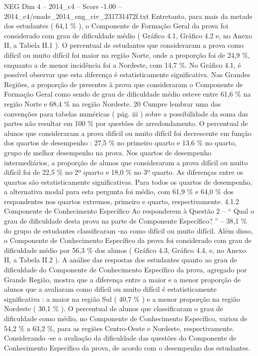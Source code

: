 \begin{textsample}{NEG Dim 4 – 2014\_c4 – Score -1.00 – 2014\_c4/enade\_2014\_eng\_civ\_231731472f.txt}
Entretanto, para mais da metade dos estudantes ( 64,1 \% ), o Componente de Formação Geral da prova foi considerado com grau de dificuldade médio ( Gráfico 4.1, Gráfico 4.2 e, no Anexo II, a Tabela II.1 ).
O percentual de estudantes que consideraram a prova como difícil ou muito difícil foi maior na região Norte, onde a proporção foi de 24,9 \%, enquanto a de menor incidência foi a Nordeste, com 14,7 \%.
No Gráfico 4.1, é possível observar que esta diferença é estatisticamente significativa.
Nas Grandes Regiões, a proporção de presentes à prova que consideraram o Componente de Formação Geral como sendo de grau de dificuldade médio esteve entre 61,6 \% na região Norte e 68,4 \% na região Nordeste. 20 Cumpre lembrar uma das convenções para tabelas numéricas ( pág. iii ) sobre a possibilidade da soma das partes não resultar em 100 \% por questões de arredondamento.
O percentual de alunos que consideraram a prova difícil ou muito difícil foi decrescente em função dos quartos de desempenho : 27,5 \% no primeiro quarto e 13,6 \% no quarto, grupo de melhor desempenho na prova.
Nos quartos de desempenho intermediários, a proporção de alunos que consideraram a prova difícil ou muito difícil foi de 22,5 \% no 2º quarto e 18,0 \% no 3º quarto.
As diferenças entre os quartos são estatisticamente significativas.
Para todos os quartos de desempenho, a alternativa modal para esta pergunta foi médio, com 61,9 \% e 64,0 \% dos respondentes nos quartos extremos, primeiro e quarto, respectivamente. 4.1.2 Componente de Conhecimento Específico Ao responderem à Questão 2 – “ Qual o grau de dificuldade desta prova na parte de Componente Específico? ” – 38,1 \% do grupo de estudantes classificaram -na como difícil ou muito difícil.
Além disso, o Componente de Conhecimento Específico da prova foi considerado com grau de dificuldade médio por 56,3 \% dos alunos ( Gráfico 4.3, Gráfico 4.4, e, no Anexo II, a Tabela II.2 ).
A análise das respostas dos estudantes quanto ao grau de dificuldade do Componente de Conhecimento Específico da prova, agregado por Grande Região, mostra que a diferença entre a maior e a menor proporção de alunos que a avaliaram como difícil ou muito difícil é estatisticamente significativa : a maior na região Sul ( 40,7 \% ) e a menor proporção na região Nordeste ( 30,1 \% ).
O percentual de alunos que classificaram o grau de dificuldade como médio, no Componente de Conhecimento Específico, variou de 54,2 \% a 63,2 \%, para as regiões Centro-Oeste e Nordeste, respectivamente.
Considerando -se a avaliação da dificuldade das questões do Componente de Conhecimento Específico da prova, de acordo com o desempenho dos estudantes.

\end{textsample}
